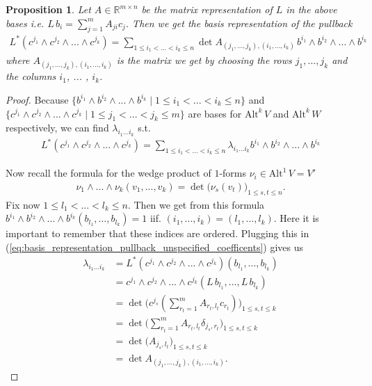 \documentclass[12pt,a4paper]{article}
\numberwithin{equation}{subsection}
\numberwithin{lemma}{subsection}
\newtheorem{proposition}[lemma]{Proposition}
\theoremstyle{definition}
\newcommand{\alternating}[2]{ {\text{Alt}^{#1}\,#2} }
\newcommand{\real}{\mathbb{R}}
\begin{document}
\begin{proposition}
    Let $A \in \real^{m\times n}$ be the matrix representation of $L$ in the 
    above bases i.e.
    $L\,b_i = \sum_{j=1}^m A_{ji} c_j$. Then we get the basis representation 
    of the pullback 
    \begin{align}
        L^* (c^{j_1} \wedge c^{j_2} \wedge ... \wedge c^{j_k})
        = \sum\limits_{1 \leq i_1 < ... < i_k \leq n} 
            \det A_{(j_1,...,j_k),(i_1,...,i_k)} \,
            b^{i_1} \wedge b^{i_2} \wedge ... \wedge b^{i_k}
        \label{eq:basis_representation_pullback}
    \end{align}
    where $A_{(j_1,...,j_k),(i_1,...,i_k)}$ is the matrix we get 
    by choosing the rows $j_1,...,j_k$  and the columns $i_1$, ... , $i_k$. 
\end{proposition}
\begin{proof}
    Because $\{ b^{i_1}\wedge b^{i_2}\wedge ... \wedge b^{i_k} 
    \mid 1 \leq i_1 < ... < i_k  \leq n \}$ and 
    $\{ c^{j_1}\wedge c^{j_2}\wedge ... \wedge c^{j_k} 
    \mid 1 \leq j_1 < ... < j_k  \leq m \}$ are bases for $\alternating{k}{V}$ 
    and $\alternating{k}{W}$ respectively, we can find $\lambda_{i_1 ... i_k}$ s.t.
    \begin{align}
        L^* (c^{j_1} \wedge c^{j_2} \wedge ... \wedge c^{j_k})
        = \sum\limits_{1 \leq i_1 < ... < i_k \leq n} 
        \lambda_{i_1 ... i_k} b^{i_1} \wedge b^{i_2} \wedge ... \wedge b^{i_k}
        \label{eq:basis_representation_pullback_unspecified_coefficents}
    \end{align}

    Now recall the formula for the wedge product of $1$-forms 
    $\nu_i \in \alternating{1}{V} = V'$
    \begin{align*}
        \nu_1 \wedge ... \wedge \nu_k (v_1,...,v_k) = 
        \det \big( \nu_s(v_t) \big)_{1 \leq s,t \leq n}.
    \end{align*}
    Fix now $1 \leq l_1 < ... <  l_k \leq n$. Then we get from this formula
    $b^{i_1} \wedge b^{i_2} \wedge ... \wedge b^{i_k} ( b_{l_1},...,b_{l_k}) = 1$ 
    iif. $(i_1,...,i_k) = (l_1,...,l_k)$. Here it is important to remember that 
    these indices are ordered. Plugging this in 
    (\ref{eq:basis_representation_pullback_unspecified_coefficents}) gives us 
    \begin{align*}
        \lambda_{i_1 ... i_k}  &= 
            L^* (c^{j_1} \wedge c^{j_2} \wedge ... \wedge c^{j_k})
            (b_{l_1},...,b_{l_k})
        \\ &= c^{j_1} \wedge c^{j_2} \wedge ... \wedge c^{j_k} 
            (L\,b_{l_1},...,L\,b_{l_k})
        \\ &= \det \big( c^{j_s}(\sum_{r_t = 1}^m A_{r_t,l_t}c_{r_t}) 
            \big)_{1 \leq s,t \leq k}
        \\ &= \det \big( \sum_{r_t = 1}^m A_{r_t,l_t} \delta_{j_s,r_t}
            \big)_{1 \leq s,t \leq k}
        \\ &= \det \big( A_{j_s,l_t} \big)_{1 \leq s,t \leq k}
        \\ &= \det A_{(j_1,...,j_k),(i_1,...,i_k)}.
    \end{align*}
\end{proof}
\end{document}
